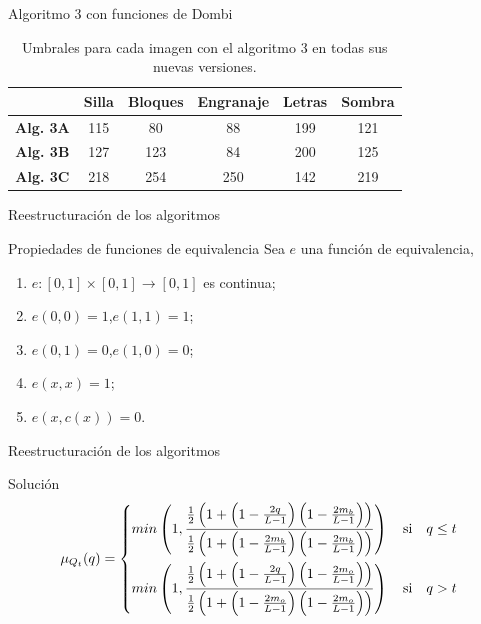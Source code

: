 \documentclass{beamer}
\theoremstyle{plain} %
\theoremstyle{definition}
\def\unmedio{\frac{1}{2}}
\def\unitinterval{[0,1]}
\newcommand{\unitspace}{\unitinterval \rightarrow \unitinterval}
\newcommand{\bb}{\bfseries}
\begin{document}
\begin{frame}{Algoritmo 3 con funciones de Dombi}
  \begin{table}
  \centering
  \begin{tabular}{c||c|c|c|c|c}
               &\bb Silla&\bb Bloques&\bb Engranaje&\bb Letras&\bb Sombra\\\hline\hline
  \bb Alg. 3A  &   115   &    80    &     88      &    199   &    121   \\\hline
  \bb Alg. 3B  &   127   &    123    &     84      &    200   &    125   \\\hline
  \bb Alg. 3C  &   218   &    254    &     250     &    142   &    219   \\\hline
  \end{tabular}
  \caption{Umbrales para cada imagen con el algoritmo 3 en todas sus nuevas versiones.\label{tab:resultexp3dombi}}
  \end{table}
\end{frame}

\begin{frame}{Reestructuración de los algoritmos}
  \begin{block}{Propiedades de funciones de equivalencia}
  Sea $e$ una función de equivalencia,
  \begin{enumerate}
    \item $e:\unitinterval\times\unitspace$ es continua;
    \item $e(0,0)=1$,\quad$e(1,1)=1$;
    \item $e(0,1)=0$,\quad$e(1,0)=0$;
    \item $e(x,x)=1$;
    \item $e(x,c(x))=0$.
  \end{enumerate}
  \end{block}
\end{frame}

\begin{frame}{Reestructuración de los algoritmos}
  \begin{exampleblock}{Solución}
  \begin{equation*}\label{eq:intentodesolucionardombi}
    \mu_{Q_t}(q)=\left\{ \begin{split}
                 min\left( 1, \frac
                    {\unmedio \left(1+\left(1-\frac{2q}{L-1}\right)\left(1-\frac{2m_b}{L-1}\right)\right)}
                    {\unmedio \left(1+\left(1-\frac{2m_b}{L-1}\right)\left(1-\frac{2m_b}{L-1}\right)\right)}\right)
                 \text{\quad si\quad} q\leq t\\
                 min\left( 1, \frac
                    {\unmedio \left(1+\left(1-\frac{2q}{L-1}\right)\left(1-\frac{2m_o}{L-1}\right)\right)}
                    {\unmedio \left(1+\left(1-\frac{2m_o}{L-1}\right)\left(1-\frac{2m_o}{L-1}\right)\right)}\right)
                \text{\quad si\quad} q > t
                \end{split}\right.
\end{equation*}
  \end{exampleblock}
\end{frame}
\end{document}
